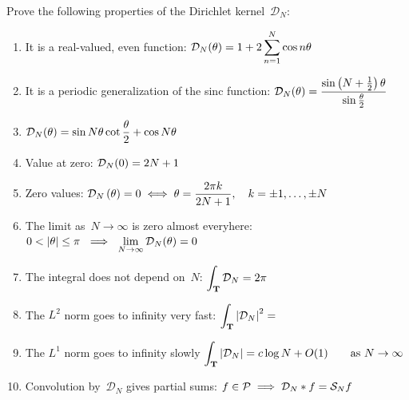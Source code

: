 \begin{exercice}
	Prove the following properties of the Dirichlet kernel~$\mathcal{D}_N$:
	\begin{enumerate}
		\item
			It is a real-valued, even function:
			$\displaystyle\mathcal{D}_N(\theta)=1+2\sum_{n=1}^{N}\cos n\theta$
		\item
			It is a periodic generalization of the sinc function:
			$\displaystyle\mathcal{D}_N(\theta)=\frac{\sin\left(N+\frac{1}{2}\right)\theta}{\sin\frac\theta2}$
		\item
			$\displaystyle\mathcal{D}_N(\theta)=\sin N\theta\cot\frac\theta2+\cos N\theta$
		\item
			Value at zero:
			$\displaystyle\mathcal{D}_N(0)=2N+1$
		\item
			Zero values:
			$\displaystyle\mathcal{D}_N\left(\theta\right)=0
			\iff
			\theta=\frac{2\pi k}{2N+1},
			\quad
			k=\pm 1,\ldots,\pm N$
		\item
			The limit as~$N\to\infty$ is zero almost everyhere:
			$\ds 0<|\theta|\le\pi\ \implies\
			\lim_{N\to\infty}\mathcal{D}_N(\theta)=0$
		\item
			The integral does not depend on~$N$:
			$\displaystyle\int_{\mathbf{T}}\mathcal{D}_N = 2\pi$
		\item
			The $L^2$ norm goes to infinity very fast:
			$\displaystyle\int_{\mathbf{T}}\left|\mathcal{D}_N\right|^2 =$
		\item
			The $L^1$ norm goes to infinity slowly
			$\displaystyle\int_{\mathbf{T}}\left|\mathcal{D}_N\right| =c\log N +
			O(1)\qquad\mathrm{as}\ N\to\infty$
		\item
			Convolution by~$\mathcal{D}_N$ gives partial sums:
			$\displaystyle f\in\mathcal{P}\implies \mathcal{D}_N*f = \mathcal{S}_N f$
	\end{enumerate}
\end{exercice}

